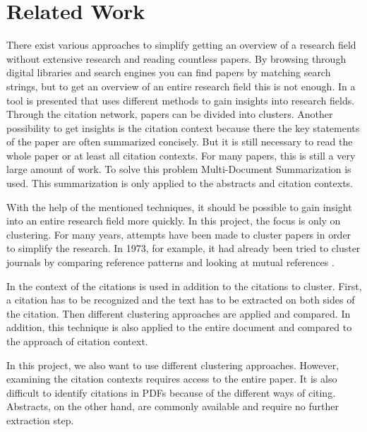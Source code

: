 \section{Related Work}

There exist various approaches to simplify getting an overview of a research field without extensive research and reading countless papers. By browsing through digital libraries and search engines you can find papers by matching search strings, but to get an overview of an entire research field this is not enough.
In \cite{Rapid_understanding_of_scientific_paper_collections} a tool is presented that uses different methods to gain insights into research fields.
Through the citation network, papers can be divided into clusters.
Another possibility to get insights is the citation context because there the key statements of the paper are often summarized concisely.  But it is still necessary to read the whole paper or at least all citation contexts. For many papers, this is still a very large amount of work. To solve this problem Multi-Document Summarization is used. This summarization is only applied to the abstracts and citation contexts.
%

With the help of the mentioned techniques, it should be possible to gain insight into an entire research field more quickly.
In this project, the focus is only on clustering.
For many years, attempts have been made to cluster papers in order to simplify the research. In 1973, for example, it had already been tried to cluster journals by comparing reference patterns and looking at mutual references \cite{Clustering_of_scientific_journals}.

In \cite{Document_clustering_of_scientific_texts_using_citation_contexts} the context of the citations is used in addition to the citations to cluster.
First, a citation has to be recognized and the text has to be extracted on both sides of the citation. Then different clustering approaches are applied and compared. In addition, this technique is also applied to the entire document and compared to the approach of citation context.

In this project, we also want to use different clustering approaches. However, examining the citation contexts requires access to the entire paper. It is also difficult to identify citations in PDFs because of the different ways of citing. Abstracts, on the other hand, are commonly available and require no further extraction step.


